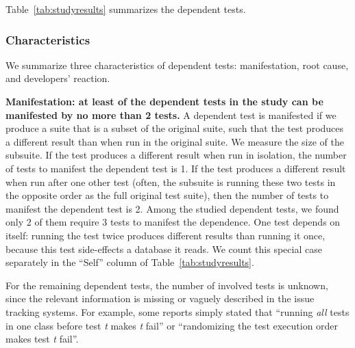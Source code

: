

Table~\ref{tab:studyresults} summarizes the dependent tests.


\subsubsection{Characteristics}


We summarize three characteristics of dependent tests:
manifestation, root cause, and developers' reaction.

\vspace{1mm}
\noindent \textbf{{Manifestation: at least \pertange of the dependent
tests in the study can be manifested by no more than 2 tests.}}
A dependent test is manifested if we produce a suite that is a 
subset of the original suite, such that the test produces a different
result than when run in the original suite.
We measure the size of the subsuite.
If the test produces a different result when run
in isolation, the number of tests to manifest
the dependent test is 1.
If the test produces a different result
when run after one other test (often, the subsuite is
running these two tests in the opposite order as the full original test
suite), then the number of tests to manifest the dependent test is 2.
Among the \dtnum studied dependent tests, we found only 2 of them
require 3 tests to manifest the dependence.
One test depends on itself:
running the test twice produces different results than running it once,
because this test side-effects a database it reads.
We count this special case separately in the ``Self'' column
of Table~\ref{tab:studyresults}.

For the remaining \unum dependent tests, the number of involved tests
is unknown, since the relevant information is missing
or vaguely described in the issue tracking systems. For example,
some reports simply stated that ``running \textit{all} tests in one class before
test \emph{t} makes \emph{t} fail'' or ``randomizing the test execution order
makes test \emph{t} fail''.





